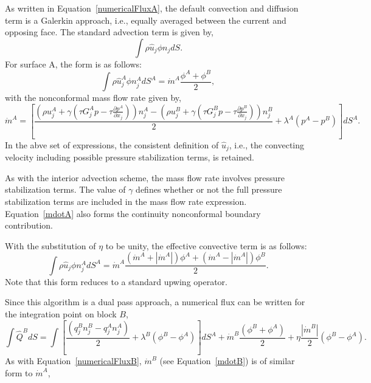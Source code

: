 As written in Equation~\ref{numericalFluxA}, the default convection and diffusion term is a
Galerkin approach, i.e., equally averaged between the current and opposing face. The standard 
advection term is given by,
\begin{equation} 
        \int \rho \hat{u}_j \phi n_j dS.
\label{advection}
\end{equation}
For surface A, the form is as follows:
\begin{equation} 
        \int \rho \hat{u}_j^A \phi n_j^A dS^A = \dot m^A \frac{ \phi^A + \phi^B}{2},
\label{advection}
\end{equation}
with the nonconformal mass flow rate given by,
\begin{equation} 
        \dot {m}^A = [\frac{(\rho u_j^A + \gamma(\tau G_j^A p -\tau \frac{\partial p^A}{\partial x_j}))n_j^A
        				       - (\rho u_j^B + \gamma(\tau G_j^B p -\tau \frac{\partial p^B}{\partial x_j}))n_j^B}{2}
				       + \lambda^A ( p^A - p^B)] dS^A.
\label{mdotA}
\end{equation}
In the abve set of expressions, the consistent definition of $\hat{u}_j$, i.e., the convecting velocity including
possible pressure stabilization terms, is retained.

As with the interior advection scheme, the mass flow rate involves pressure stabilization terms. The value of 
$\gamma$ defines whether or not the full pressure stabilization terms are included in the mass flow rate expression.
Equation~\ref{mdotA} also forms the continuity nonconformal boundary contribution. 

With the substitution of $\eta$ to be unity, the effective convective term is as follows:
\begin{equation} 
        \int \rho \hat{u}_j \phi n_j^A dS^A = \dot m^A \frac{ (\dot m^A + |\dot m^A|) \phi^A +  (\dot m^A - |\dot m^A|)\phi^B}{2}.
\label{advectionAUPW}
\end{equation}
Note that this form reduces to a standard upwing operator.

Since this algorithm is a dual pass approach, a numerical flux can be written for the integration 
point on block $B$,
\begin{equation} 
        \int \hat Q^B dS = \int [\frac{(q_j^B n_j^B - q_j^A n_j^A)}{2}
				+ \lambda^B ( \phi^B - \phi^A) ]dS^A
        				+ \dot m^B \frac{(\phi^B + \phi^A)}{2} 
                                        + \eta \frac{|\dot{m}^B|}{2} (\phi^B - \phi^A).
\label{numericalFluxB}
\end{equation}
As with Equation~\ref{numericalFluxB}, $\dot{m}^B$ (see Equation~\ref{mdotB}) 
is of similar form to $\dot{m}^A$,

